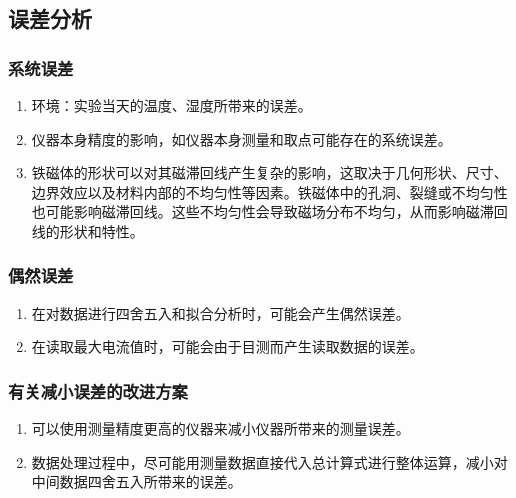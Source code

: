 \subsection{误差分析}
\subsubsection{系统误差}
\begin{enumerate}
    \item 环境：实验当天的温度、湿度所带来的误差。
    \item 仪器本身精度的影响，如仪器本身测量和取点可能存在的系统误差。
    \item 铁磁体的形状可以对其磁滞回线产生复杂的影响，这取决于几何形状、尺寸、边界效应以及材料内部的不均匀性等因素。铁磁体中的孔洞、裂缝或不均匀性也可能影响磁滞回线。这些不均匀性会导致磁场分布不均匀，从而影响磁滞回线的形状和特性。
\end{enumerate}
\subsubsection{偶然误差}
\begin{enumerate}
    \item 在对数据进行四舍五入和拟合分析时，可能会产生偶然误差。
    \item 在读取最大电流值时，可能会由于目测而产生读取数据的误差。
\end{enumerate}
\subsubsection{有关减小误差的改进方案}
\begin{enumerate}
    \item 可以使用测量精度更高的仪器来减小仪器所带来的测量误差。
    \item 数据处理过程中，尽可能用测量数据直接代入总计算式进行整体运算，减小对中间数据四舍五入所带来的误差。
\end{enumerate}
